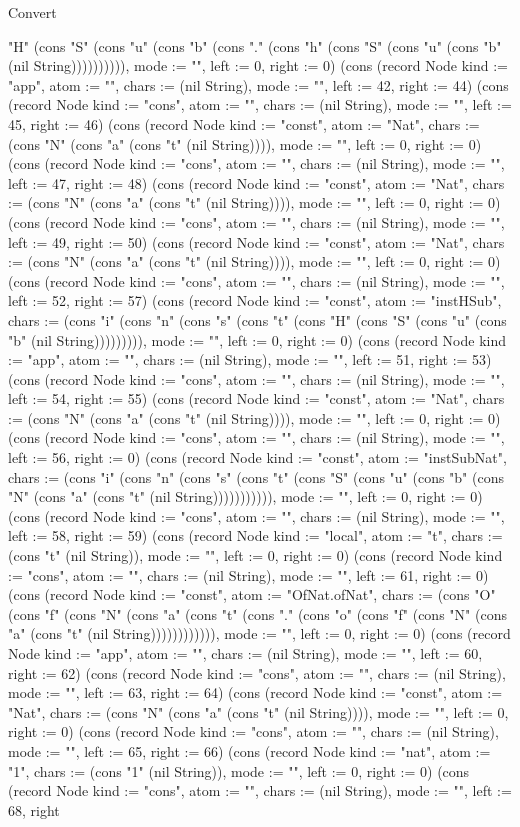 \begin{lexlean}{Convert}
\begin{semanticmodule}
{"H" (cons "S" (cons "u" (cons "b" (cons "." (cons "h" (cons "S" (cons "u" (cons "b" (nil String)))))))))), mode := "", left := 0, right := 0}) (cons (record Node {kind := "app", atom := "", chars := (nil String), mode := "", left := 42, right := 44}) (cons (record Node {kind := "cons", atom := "", chars := (nil String), mode := "", left := 45, right := 46}) (cons (record Node {kind := "const", atom := "Nat", chars := (cons "N" (cons "a" (cons "t" (nil String)))), mode := "", left := 0, right := 0}) (cons (record Node {kind := "cons", atom := "", chars := (nil String), mode := "", left := 47, right := 48}) (cons (record Node {kind := "const", atom := "Nat", chars := (cons "N" (cons "a" (cons "t" (nil String)))), mode := "", left := 0, right := 0}) (cons (record Node {kind := "cons", atom := "", chars := (nil String), mode := "", left := 49, right := 50}) (cons (record Node {kind := "const", atom := "Nat", chars := (cons "N" (cons "a" (cons "t" (nil String)))), mode := "", left := 0, right := 0}) (cons (record Node {kind := "cons", atom := "", chars := (nil String), mode := "", left := 52, right := 57}) (cons (record Node {kind := "const", atom := "instHSub", chars := (cons "i" (cons "n" (cons "s" (cons "t" (cons "H" (cons "S" (cons "u" (cons "b" (nil String))))))))), mode := "", left := 0, right := 0}) (cons (record Node {kind := "app", atom := "", chars := (nil String), mode := "", left := 51, right := 53}) (cons (record Node {kind := "cons", atom := "", chars := (nil String), mode := "", left := 54, right := 55}) (cons (record Node {kind := "const", atom := "Nat", chars := (cons "N" (cons "a" (cons "t" (nil String)))), mode := "", left := 0, right := 0}) (cons (record Node {kind := "cons", atom := "", chars := (nil String), mode := "", left := 56, right := 0}) (cons (record Node {kind := "const", atom := "instSubNat", chars := (cons "i" (cons "n" (cons "s" (cons "t" (cons "S" (cons "u" (cons "b" (cons "N" (cons "a" (cons "t" (nil String))))))))))), mode := "", left := 0, right := 0}) (cons (record Node {kind := "cons", atom := "", chars := (nil String), mode := "", left := 58, right := 59}) (cons (record Node {kind := "local", atom := "t", chars := (cons "t" (nil String)), mode := "", left := 0, right := 0}) (cons (record Node {kind := "cons", atom := "", chars := (nil String), mode := "", left := 61, right := 0}) (cons (record Node {kind := "const", atom := "OfNat.ofNat", chars := (cons "O" (cons "f" (cons "N" (cons "a" (cons "t" (cons "." (cons "o" (cons "f" (cons "N" (cons "a" (cons "t" (nil String)))))))))))), mode := "", left := 0, right := 0}) (cons (record Node {kind := "app", atom := "", chars := (nil String), mode := "", left := 60, right := 62}) (cons (record Node {kind := "cons", atom := "", chars := (nil String), mode := "", left := 63, right := 64}) (cons (record Node {kind := "const", atom := "Nat", chars := (cons "N" (cons "a" (cons "t" (nil String)))), mode := "", left := 0, right := 0}) (cons (record Node {kind := "cons", atom := "", chars := (nil String), mode := "", left := 65, right := 66}) (cons (record Node {kind := "nat", atom := "1", chars := (cons "1" (nil String)), mode := "", left := 0, right := 0}) (cons (record Node {kind := "cons", atom := "", chars := (nil String), mode := "", left := 68, right }
\end{semanticmodule}
\end{lexlean}
